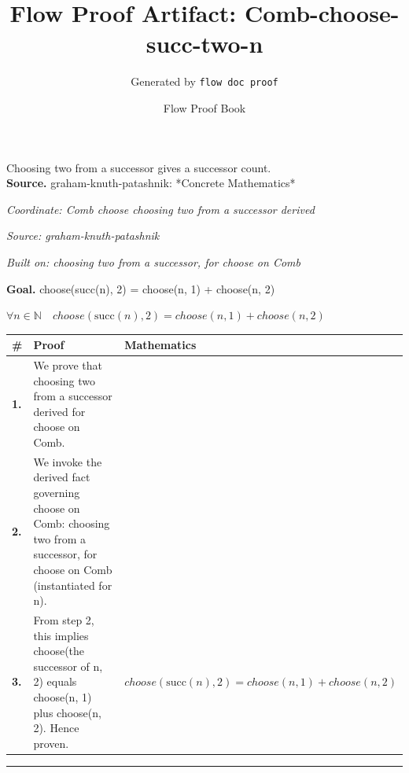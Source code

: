 \documentclass[11pt]{article}
\title{Flow Proof Artifact: Comb-choose-succ-two-n}
\author{Generated by \texttt{flow doc proof}}
\date{Flow Proof Book}
\theoremstyle{definition}
\begin{document}
\maketitle
Choosing two from a successor gives a successor count.\\[0.5em]
\textbf{Source.} graham-knuth-patashnik: *Concrete Mathematics*\\[0.5em]
\bigskip
{}\par
\smallskip\noindent\textit{Coordinate: Comb \cdot choose \cdot choosing two from a successor derived}\par
\smallskip\noindent\textit{Source: graham-knuth-patashnik}\par
\smallskip\noindent\textit{Built on: choosing two from a successor, for choose on Comb}\par
\medskip
\noindent\textbf{Goal.} choose(succ(n), 2) = choose(n, 1) + choose(n, 2)\par
\noindent$\displaystyle \forall n \in \mathbb{N}\quad choose(\mathrm{succ}(n), 2) = choose(n, 1) + choose(n, 2)$\par
\medskip
\noindent
\begin{tabular}{@{} >{\raggedright\arraybackslash}p{} >{\raggedright\arraybackslash}p{} >{\raggedleft\arraybackslash}p{} @{}}
\textbf{\#} & \textbf{Proof} & \textbf{Mathematics} \\
\midrule
\textbf{1.} & We prove that choosing two from a successor derived for choose on Comb. & \\[0.45em]
\textbf{2.} & We invoke the derived fact governing choose on Comb: choosing two from a successor, for choose on Comb (instantiated for n). & \\[0.45em]
\textbf{3.} & From step 2, this implies choose(the successor of n, 2) equals choose(n, 1) plus choose(n, 2). Hence proven. & $\displaystyle choose(\mathrm{succ}(n), 2) = choose(n, 1) + choose(n, 2)$ \\[0.45em]
\bottomrule
\end{tabular}
\label{thm:Comb-choose-choosing_two_from_a_successor_derived}
\par\medskip\hrule
\end{document}
